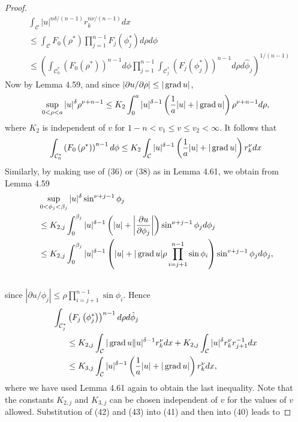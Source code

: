\begin{proof}
  \[
  \begin{aligned}
  & \int_{\mathcal{C}}|u|^{n \delta /(n-1)} r_k^{n \nu /(n-1)} d x \\
  & \leq \int_{\mathcal{C}} F_0\left(\rho^*\right) \prod_{j=1}^{n-1} F_j\left(\phi_j^*\right) d \rho d \phi \\
  & \leq\left(\int_{\mathcal{C}_0^*}\left(F_0\left(\rho^*\right)\right)^{n-1} d \phi \prod_{j=1}^{n-1} \int_{\mathcal{C}_j^*}\left(F_j\left(\phi_j^*\right)\right)^{n-1} d \rho d \hat{\phi}_j\right)^{1 /(n-1)}
  \end{aligned}
  \]
  Now by Lemma 4.59, and since $|\partial u / \partial \rho| \leq|\operatorname{grad} u|$,
  \[
  \sup _{0<\rho<a}|u|^\delta \rho^{\nu+n-1} \leq K_2 \int_0^a|u|^{\delta-1}\left(\frac{1}{a}|u|+|\operatorname{grad} u|\right) \rho^{\nu+n-1} d \rho,
  \]
  where $K_2$ is independent of $v$ for $1-n<v_1 \leq v \leq v_2<\infty$. It follows that
  \[
  \int_{\mathcal{C}_0^*}\left(F_0\left(\rho^*\right)\right)^{n-1} d \phi \leq K_2 \int_{\mathcal{C}}|u|^{\delta-1}\left(\frac{1}{a}|u|+|\operatorname{grad} u|\right) r_k^\nu d x
  \]
  Similarly, by making use of (36) or (38) as in Lemma 4.61, we obtain from Lemma 4.59
  \[
  \begin{aligned}
  & \sup _{0<\phi_j<\beta_j}|u|^\delta \sin ^{\nu+j-1} \phi_j \\
  & \leq K_{2, j} \int_0^{\beta_j}|u|^{\delta-1}\left(|u|+\left|\frac{\partial u}{\partial \phi_j}\right|\right) \sin ^{\nu+j-1} \phi_j d \phi_j \\
  & \leq K_{2, j} \int_0^{\beta_j}|u|^{\delta-1}\left(|u|+|\operatorname{grad} u| \rho \prod_{i=j+1}^{n-1} \sin \phi_i\right) \sin ^{v+j-1} \phi_j d \phi_j, \\
  &
  \end{aligned}
  \]
  since $\left|\partial u / \phi_j\right| \leq \rho \prod_{i=j+1}^{n-1} \sin \phi_i$. Hence
  \[
  \begin{aligned}
  \int_{\mathcal{C}_j^*} & \left(F_j\left(\phi_j^*\right)\right)^{n-1} d \rho d \hat{\phi}_j \\
  & \leq K_{2, j} \int_{\mathcal{C}}|\operatorname{grad} u \| u|^{\delta-1} r_k^\nu d x+K_{2, j} \int_{\mathcal{C}}|u|^\delta r_k^\nu r_{j+1}^{-1} d x \\
  & \leq K_{3, j} \int_{\mathcal{C}}|u|^{\delta-1}\left(\frac{1}{a}|u|+|\operatorname{grad} u|\right) r_k^\nu d x,
  \end{aligned}
  \]
  where we have used Lemma 4.61 again to obtain the last inequality. Note that the constants $K_{2, j}$ and $K_{3, j}$ can be chosen independent of $v$ for the values of $v$ allowed. Substitution of (42) and (43) into (41) and then into (40) leads to

\end{proof}
